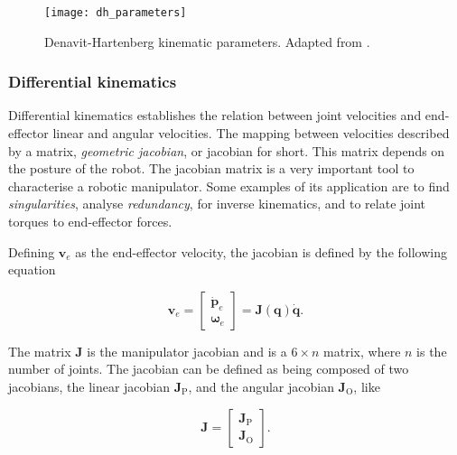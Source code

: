 \begin{figure}[htbp]
	\centering
	\texttt{[image: dh\_parameters]}
	\caption[Denavit-Hartenberg kinematic parameters.]{Denavit-Hartenberg kinematic parameters. Adapted from \cite{Siciliano2009_robotics_modelling_planning_control}.}
	\label{fig:dh_parameters}
\end{figure}


\subsubsection{Differential kinematics}
\label{subsubsec:differential_kinematics}

Differential kinematics establishes the relation between joint velocities and end-effector linear and angular velocities. The mapping between velocities described by a matrix, \emph{geometric jacobian}, or jacobian for short. This matrix depends on the posture of the robot. The jacobian matrix is a very important tool to characterise a robotic manipulator. Some examples of its application are to find \emph{singularities}, analyse \emph{redundancy}, for inverse kinematics, and to relate joint torques to end-effector forces.

Defining $\boldsymbol{v}_e$ as the end-effector velocity, the jacobian is defined by the following equation

\begin{equation}
    \boldsymbol{v}_e = \begin{bmatrix}
    \dot{\boldsymbol{p}}_e\\
    \boldsymbol{\omega}_e
    \end{bmatrix} = \boldsymbol{J}(\boldsymbol{q})\dot{\boldsymbol{q}}.
\end{equation}

The matrix $\boldsymbol{J}$ is the manipulator jacobian and is a $6 \times n$ matrix, where $n$ is the number of joints. The jacobian can be defined as being composed of two jacobians, the linear jacobian $\boldsymbol{J}_\text{P}$, and the angular jacobian $\boldsymbol{J}_\text{O}$, like

\begin{equation}
    \boldsymbol{J} = \begin{bmatrix}
    \boldsymbol{J}_\text{P}\\
    \boldsymbol{J}_\text{O}
    \end{bmatrix}.
\end{equation}

